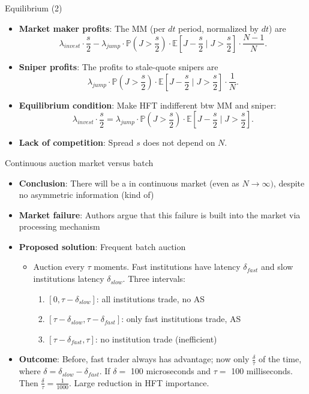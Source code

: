 \documentclass[english,10pt
,aspectratio=169
]{beamer}
\begin{document}
\begin{frame}{Equilibrium (2)}
	\begin{itemize}
		\item \textbf{Market maker profits}: The MM  (per $dt$ period, normalized by $dt$) are
		\[
		\lambda_{invest}\cdot \frac{s}{2}-\lambda_{jump}\cdot \mathbb{P}\left(J>\frac{s}{2}\right) \cdot \mathbb{E} \left[J-\frac{s}{2} \mid J>\frac{s}{2}\right] \cdot \frac{N-1}{N}.
		\]
		\item \textbf{Sniper profits}: The profits to stale-quote snipers are
		\[
		\lambda_{jump}\cdot \mathbb{P} \left(J>\frac{s}{2} \right) \cdot \mathbb{E} \left[J-\frac{s}{2} \mid J>\frac{s}{2}\right] \cdot \frac{1}{N}.
		\]
		\item \textbf{Equilibrium condition}: Make HFT indifferent btw MM and sniper:
		\[
		\lambda_{invest} \cdot \frac{s}{2} = \lambda_{jump}\cdot \mathbb{P} \left(J>\frac{s}{2} \right) \cdot \mathbb{E} \left[J-\frac{s}{2} \mid J>\frac{s}{2}\right] .
		\]
		\item \textbf{Lack of competition}: Spread $s$ does not depend on $N$.
	\end{itemize}
\end{frame}


\begin{frame}{Continuous auction market versus batch}
	\begin{itemize}
		\item \textbf{Conclusion}: There will be a  in continuous market (even as $N \rightarrow \infty)$, despite \alert{no asymmetric information} (kind of)
		\item \textbf{Market failure}: Authors argue that this failure is built into the market via processing mechanism
		\item \textbf{Proposed solution}: Frequent batch auction
		\begin{itemize}
			\item Auction every $\tau$ moments. Fast institutions have latency $\delta_{fast}$ and slow institutions latency $\delta_{slow}$. Three intervals:
			\begin{enumerate}
				\item  $[0,\tau-\delta_{slow}]$: all institutions trade, no AS
				\item  $[\tau-\delta_{slow},\tau-\delta_{fast}]$: only fast institutions trade, AS
				\item  $[\tau-\delta_{fast},\tau]$: no institution trade (inefficient)
			\end{enumerate}
		\end{itemize}
		\item \textbf{Outcome}: Before, fast trader always has advantage; now only $\frac{\delta}{\tau}$ of the time, where $\delta = \delta_{slow}-\delta_{fast}$. If $\delta=$ 100 microseconds and $\tau=$ 100 milliseconds. Then $\frac{\delta}{\tau}=\frac{1}{1000}$. Large reduction in HFT importance.
	\end{itemize}
\end{frame}
\end{document}
